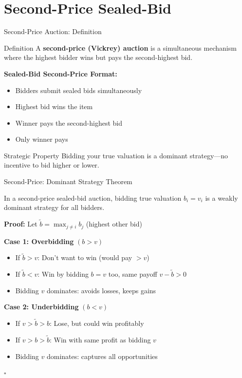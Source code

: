 \documentclass[xcolor={x11names}, aspectratio=169 ]{beamer}
\begin{document}
\section{Second-Price Sealed-Bid}

\begin{frame}{Second-Price Auction: Definition}
\begin{block}{Definition}
A \textbf{second-price (Vickrey) auction} is a simultaneous mechanism where the highest bidder wins but pays the second-highest bid.
\end{block}

\textbf{Sealed-Bid Second-Price Format:}
\begin{itemize}
\item Bidders submit sealed bids simultaneously
\item Highest bid wins the item
\item Winner pays the second-highest bid
\item Only winner pays
\end{itemize}

\begin{alertblock}{Strategic Property}
Bidding your true valuation is a dominant strategy—no incentive to bid higher or lower.
\end{alertblock}
\end{frame}

\begin{frame}{Second-Price: Dominant Strategy Theorem}
\begin{theorem}
In a second-price sealed-bid auction, bidding true valuation $b_i = v_i$ is a weakly dominant strategy for all bidders.
\end{theorem}

\textbf{Proof:} Let $\tilde{b} = \max_{j \neq i} b_j$ (highest other bid)

\textbf{Case 1: Overbidding} $(b > v)$
\begin{itemize}
    \item If $\tilde{b}> v$: Don't want to win (would pay $> v$)
    \item If $\tilde{b}< v$: Win by bidding $b=v$ too, same payoff $v-\tilde{b}>0$
    \item Bidding $v$ dominates: avoids losses, keeps gains
\end{itemize}

\textbf{Case 2: Underbidding} $(b < v)$
\begin{itemize}
  \item If $v > \tilde{b} > b$: Lose, but could win profitably
  \item If $v > b > \tilde{b}$: Win with same profit as bidding $v$ 
  \item Bidding $v$ dominates: captures all opportunities
\end{itemize}

$\square$
\end{frame}
\end{document}
